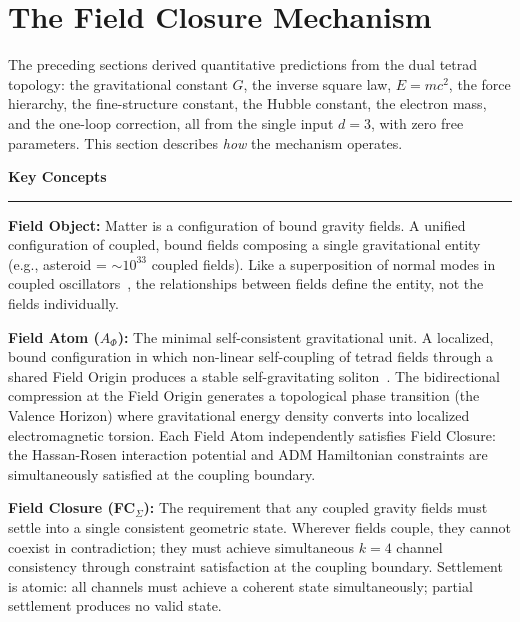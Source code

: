 \documentclass[aps,prd,preprint,superscriptaddress,showpacs,preprintnumbers,amsmath,amssymb,nofootinbib]{revtex4-2}
\begin{document}
\section{The Field Closure Mechanism}
\label{sec:mechanism}

The preceding sections derived quantitative predictions from the dual tetrad topology: the gravitational constant $G$, the inverse square law, $E = mc^2$, the force hierarchy, the fine-structure constant, the Hubble constant, the electron mass, and the one-loop correction, all from the single input $d = 3$, with zero free parameters. This section describes \emph{how} the mechanism operates.

\vspace{1em}
\noindent\textbf{Key Concepts}

\noindent\rule{\textwidth}{0.4pt}

\noindent\textbf{Field Object:} Matter is a configuration of bound gravity fields. A unified configuration of coupled, bound fields composing a single gravitational entity (e.g., asteroid = $\sim 10^{33}$ coupled fields). Like a superposition of normal modes in coupled oscillators~\cite{goldstein2002,feynman1985}, the relationships between fields define the entity, not the fields individually.

\smallskip

\noindent\textbf{Field Atom ($A_\Phi$):} The minimal self-consistent gravitational unit. A localized, bound configuration in which non-linear self-coupling of tetrad fields through a shared Field Origin produces a stable self-gravitating soliton~\cite{wheeler1955}. The bidirectional compression at the Field Origin generates a topological phase transition (the Valence Horizon) where gravitational energy density converts into localized electromagnetic torsion. Each Field Atom independently satisfies Field Closure: the Hassan-Rosen interaction potential and ADM Hamiltonian constraints are simultaneously satisfied at the coupling boundary.

\smallskip

\noindent\textbf{Field Closure (FC$_{\Sigma}$):} The requirement that any coupled gravity fields must settle into a single consistent geometric state. Wherever fields couple, they cannot coexist in contradiction; they must achieve simultaneous $k = 4$ channel consistency through constraint satisfaction at the coupling boundary. Settlement is atomic: all channels must achieve a coherent state simultaneously; partial settlement produces no valid state.
\end{document}
